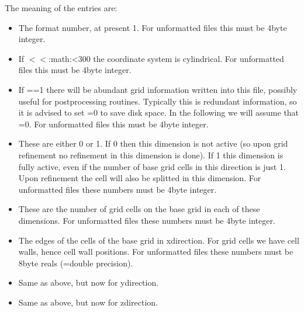 \documentclass[letterpaper,10pt,english]{sphinxmanual}
\begin{document}
The meaning of the entries are:
\begin{itemize}
\item {} 
 The format number, at present 1. For
unformatted files this must be 4\sphinxhyphen{}byte integer.

\item {} 
 If \(<\)\(<\):math:{\color{red}\bfseries{}\textasciigrave{}}\textless{}{\color{red}\bfseries{}\textasciigrave{}}300 the coordinate system is cylindrical. For unformatted
files this must be 4\sphinxhyphen{}byte integer.

\item {} 
 If ==1 there will be
abundant grid information written into this file, possibly useful for
post\sphinxhyphen{}processing routines. Typically this is redundant information, so it
is advised to set =0 to save disk space. In the
following we will assume that =0. For unformatted
files this must be 4\sphinxhyphen{}byte integer.

\item {} 
 These are either 0 or
1. If 0 then this dimension is not active (so upon grid refinement no
refinement in this dimension is done). If 1 this dimension is fully
active, even if the number of base grid cells in this direction is just
1. Upon refinement the cell will also be splitted in this dimension. For
unformatted files these numbers must be 4\sphinxhyphen{}byte integer.

\item {} 
 These are the number of grid cells on the
base grid in each of these dimensions. For unformatted files these numbers
must be 4\sphinxhyphen{}byte integer.

\item {} 
 The edges of the cells of the base grid in
x\sphinxhyphen{}direction. For  grid cells we have  cell walls, hence 
cell wall positions. For unformatted files these numbers must be 8\sphinxhyphen{}byte reals
(=double precision).

\item {} 
 Same as above, but now for
y\sphinxhyphen{}direction.

\item {} 
 Same as above, but now for
z\sphinxhyphen{}direction.

\end{itemize}
\end{document}
